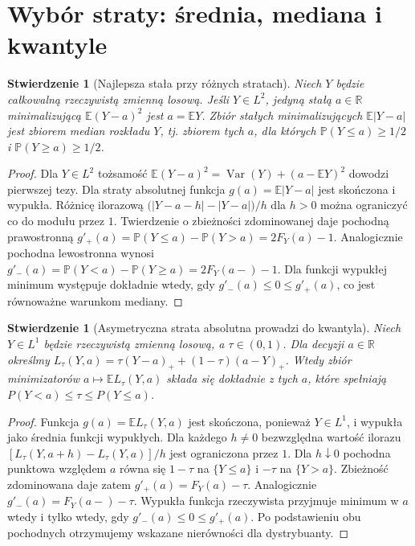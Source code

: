 \documentclass[11pt,a4paper,oneside]{report}
\numberwithin{equation}{chapter}
\theoremstyle{plain}
\newtheorem{stwierdzenie}[twierdzenie]{Stwierdzenie}
\theoremstyle{definition}
\theoremstyle{remark}
\newcommand{\R}{\mathbb R}
\newcommand{\Prob}{\mathbb P}
\newcommand{\E}{\mathbb E}
\newcommand{\Var}{\operatorname{Var}}
\begin{document}
\section{Wybór straty: średnia, mediana i kwantyle}
\begin{stwierdzenie}[Najlepsza stała przy różnych stratach]
\label{prop:optimal-constant-loss}
Niech $Y$ będzie całkowalną rzeczywistą zmienną losową.
Jeśli $Y\in L^2$, jedyną stałą $a\in\R$ minimalizującą
$\E(Y-a)^2$ jest $a=\E Y$.
Zbiór stałych minimalizujących $\E|Y-a|$ jest zbiorem median
rozkładu $Y$, tj. zbiorem tych $a$, dla których
$\Prob(Y\le a)\ge1/2$ i $\Prob(Y\ge a)\ge1/2$.
\end{stwierdzenie}
\begin{proof}
Dla $Y\in L^2$ tożsamość
$\E(Y-a)^2=\Var(Y)+(a-\E Y)^2$ dowodzi pierwszej tezy.
Dla straty absolutnej funkcja $g(a)=\E|Y-a|$ jest skończona
i wypukła. Różnicę ilorazową
$\bigl(|Y-a-h|-|Y-a|\bigr)/h$ dla $h>0$
można ograniczyć co do modułu przez $1$.
Twierdzenie o zbieżności zdominowanej daje pochodną prawostronną
$g'_+(a)=\Prob(Y\le a)-\Prob(Y>a)=2F_Y(a)-1$.
Analogicznie pochodna lewostronna wynosi
$g'_-(a)=\Prob(Y<a)-\Prob(Y\ge a)=2F_Y(a-)-1$.
Dla funkcji wypukłej minimum występuje dokładnie wtedy, gdy
$g'_-(a)\le0\le g'_+(a)$, co jest równoważne warunkom mediany.
\end{proof}


\begin{stwierdzenie}[Asymetryczna strata absolutna prowadzi do kwantyla]
\label{prop:pinball-quantile}
Niech $Y\in L^1$ będzie rzeczywistą zmienną losową, a $\tau\in(0,1)$.
Dla decyzji $a\in\R$ określmy
$L_\tau(Y,a)=\tau(Y-a)_++(1-\tau)(a-Y)_+$.
Wtedy zbiór minimizatorów $a\mapsto\E L_\tau(Y,a)$
składa się dokładnie z tych $a$, które spełniają
$P(Y<a)\le\tau\le P(Y\le a)$.
\end{stwierdzenie}
\begin{proof}
Funkcja $g(a)=\E L_\tau(Y,a)$ jest skończona, ponieważ
$Y\in L^1$, i wypukła jako średnia funkcji wypukłych.
Dla każdego $h\ne0$ bezwzględna wartość ilorazu
$[L_\tau(Y,a+h)-L_\tau(Y,a)]/h$ jest ograniczona przez $1$.
Dla $h\downarrow0$ pochodna punktowa względem $a$ równa się
$1-\tau$ na $\{Y\le a\}$ i $-\tau$ na $\{Y>a\}$.
Zbieżność zdominowana daje zatem $g'_+(a)=F_Y(a)-\tau$.
Analogicznie $g'_-(a)=F_Y(a-)-\tau$.
Wypukła funkcja rzeczywista przyjmuje minimum w $a$ wtedy i tylko
wtedy, gdy $g'_-(a)\le0\le g'_+(a)$. Po podstawieniu obu
pochodnych otrzymujemy wskazane nierówności dla dystrybuanty.
\end{proof}
\end{document}
